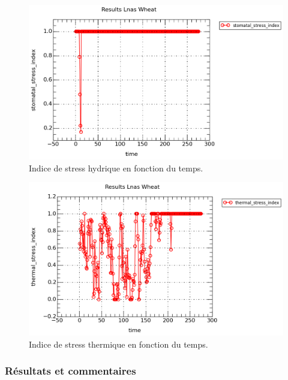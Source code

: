 \begin{figure}[H]

\begin{center}
 \includegraphics[scale = 0.67]{./img/waterStress.png}
 \caption{Indice de stress hydrique en fonction du temps.}
 \label{fig:resultatStressH}
\end{center}

\end{figure}

\begin{figure}[H]

\begin{center}
 \includegraphics[scale = 0.67]{./img/thermicStress.png}
 \caption{Indice de stress thermique en fonction du temps.}
 \label{fig:resultatStressT}
\end{center}

\end{figure}

\subsubsection{Résultats et commentaires}

